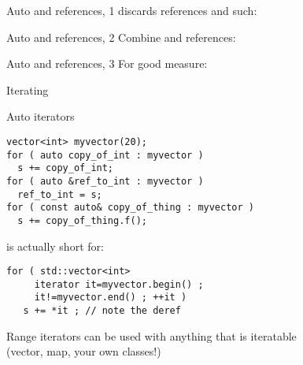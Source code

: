 \begin{block}{Auto and references, 1}
  \label{sl:auto-ref1}
   discards references and such:
\end{block}

\begin{block}{Auto and references, 2}
  \label{sl:auto-ref2}
  Combine  and references:
\end{block}

\begin{block}{Auto and references, 3}
  \label{sl:auto-ref3}
  For good measure:
\end{block}

\begin{comment}
  \begin{block}{Auto plus}
    \label{sl:auto-plus-const}
    Keywords like \n{const} and the reference character~\n{\&} can be
    added:
\begin{lstlisting}
// class member
  some_object my_object;
// class method:
  some_object &get_some_object() { return my_object; };
// main program:
auto object_copy  = thing.get_some_object();
auto &object_mutable  = thing.get_some_object();
const auto &object_immutable  = thing.get_some_object();
\end{lstlisting}
  \end{block}
\end{comment}

 {Iterating}

\begin{block}{Auto iterators}
  \label{sl:auto-iterator}
  \begin{multicols}{2}
\begin{lstlisting}
vector<int> myvector(20);
for ( auto copy_of_int : myvector )
  s += copy_of_int;
for ( auto &ref_to_int : myvector )
  ref_to_int = s;
for ( const auto& copy_of_thing : myvector )
  s += copy_of_thing.f();
\end{lstlisting}
    is actually short for:
\begin{lstlisting}
for ( std::vector<int>
     iterator it=myvector.begin() ;
     it!=myvector.end() ; ++it )
   s += *it ; // note the deref
\end{lstlisting}
  \end{multicols}
  Range iterators can be used with anything that is iteratable\\
  (vector, map, your own classes!)
\end{block}

